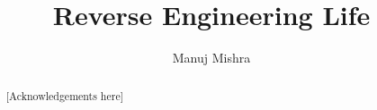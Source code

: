 \documentclass[a4paper, twoside]{report}
\title{Reverse Engineering Life}
\author{Manuj Mishra}
\begin{document}


\begin{abstract}

\end{abstract}

\renewcommand{\abstractname}{Acknowledgements}
\renewcommand{\listtheoremname}{List of Definitions}
\renewcommand{\vec}[1]{\underline{\mathbf{#1}}}
\newcommand{\round}[1]{\ensuremath{\lfloor#1\rceil}}
\begin{abstract}
[Acknowledgements here]
\end{abstract}

\tableofcontents
\listoffigures
\listoftheorems[ignoreall, show={definition}]
\begingroup
\let\clearpage\relax
\listofalgorithms
\endgroup











\end{document}
